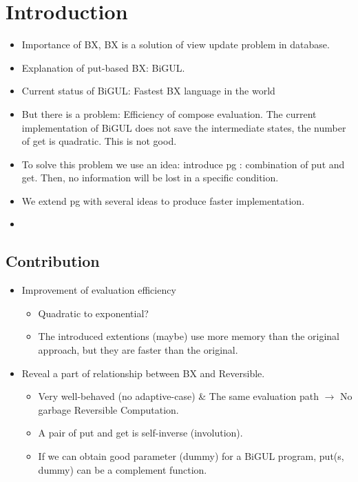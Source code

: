 \documentclass[runningheads]{llncs}
\begin{document}
\section{Introduction}



\begin{itemize}
\item Importance of BX, BX is a solution of view update problem in database.
\item Explanation of put-based BX: BiGUL.
\item Current status of BiGUL: Fastest BX language in the world
\item But there is a problem: Efficiency of compose evaluation. The current implementation of BiGUL does not save the intermediate states, the number of get is quadratic. This is not good.
\item To solve this problem we use an idea: introduce pg : combination of put and get. Then, no information will be lost in a specific condition.
\item We extend pg with several ideas to produce faster implementation.
\item 
\end{itemize}

\subsection{Contribution}

\begin{itemize}
\item Improvement of evaluation efficiency
  \begin{itemize}
  \item Quadratic to exponential? 
  \item The introduced extentions (maybe) use more memory than the original approach, but they are faster than the original.
  \end{itemize}
\item Reveal a part of relationship between BX and Reversible.
  \begin{itemize}
  \item Very well-behaved (no adaptive-case) \& The same evaluation path $\to$ No garbage Reversible Computation.
  \item A pair of put and get is self-inverse (involution).
  \item If we can obtain good parameter (dummy) for a BiGUL program,
    put(s, dummy) can be a complement function.
  \end {itemize}

\end{itemize}
\end{document}
